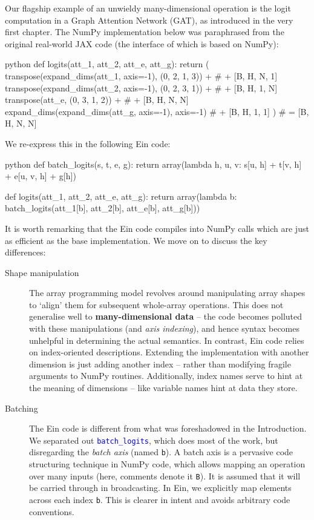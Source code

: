 Our flagship example of an unwieldy many-dimensional operation is the logit computation in a Graph Attention Network (GAT), as introduced in the very first chapter. The NumPy implementation below was paraphrased from the original real-world JAX code (the interface of which is based on NumPy):
\begin{center}
\begin{cminted}{python}
def logits(att_1, att_2, att_e, att_g):
    return (
        transpose(expand_dims(att_1, axis=-1), (0, 2, 1, 3)) +  # + [B, H, N, 1]
        transpose(expand_dims(att_2, axis=-1), (0, 2, 3, 1)) +  # + [B, H, 1, N]
        transpose(att_e, (0, 3, 1, 2)) +                        # + [B, H, N, N]
        expand_dims(expand_dims(att_g, axis=-1), axis=-1)       # + [B, H, 1, 1]
    )                                                           # = [B, H, N, N]
\end{cminted}
\end{center}
We re-express this in the following Ein code:
\begin{center}
\begin{cminted}{python}
def batch_logits(s, t, e, g):
    return array(lambda h, u, v: s[u, h] + t[v, h] + e[u, v, h] + g[h])

def logits(att_1, att_2, att_e, att_g):
    return array(lambda b: batch_logits(att_1[b], att_2[b], att_e[b], att_g[b]))
\end{cminted}
\end{center}
It is worth remarking that the Ein code compiles into NumPy calls which are just as efficient as the base implementation. We move on to discuss the key differences:

\begin{description}
    \item[Shape manipulation] The array programming model revolves around manipulating array shapes to `align' them for subsequent whole-array operations. This does not generalise well to \textbf{many-dimensional data} -- the code becomes polluted with these manipulations (and \textit{axis indexing}), and hence syntax becomes unhelpful in determining the actual semantics. In contrast, Ein code relies on index-oriented descriptions. Extending the implementation with another dimension is just adding another index -- rather than modifying fragile arguments to NumPy routines. Additionally, index names serve to hint at the meaning of dimensions -- like variable names hint at data they store.
    \item[Batching] The Ein code is different from what was foreshadowed in the Introduction. We separated out \textcolor{blue}{\texttt{batch\_logits}}, which does most of the work, but disregarding the \textit{batch axis} (named \texttt{b}). A batch axis is a pervasive code structuring technique in NumPy code, which allows mapping an operation over many inputs (here, comments denote it \texttt{B}). It is assumed that it will be carried through in broadcasting. In Ein, we explicitly map elements across each index \texttt{b}. This is clearer in intent and avoids arbitrary code conventions.
\end{description}

